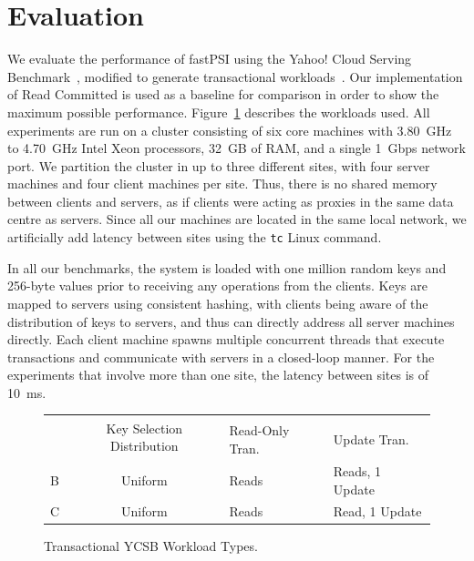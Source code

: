 \section{Evaluation}

We evaluate the performance of fastPSI using the Yahoo! Cloud Serving Benchmark~\citep{ycsb}, modified to generate transactional workloads~\citep{ardekani_nmsi, ardekani_gdur}. Our implementation of Read Committed is used as a baseline for comparison in order to show the maximum possible performance. Figure~\ref{fig:workload-types} describes the workloads used. All experiments are run on a cluster consisting of six core machines with 3.80~GHz to 4.70~GHz Intel Xeon processors, 32~GB of RAM, and a single 1~Gbps network port. We partition the cluster in up to three different sites, with four server machines and four client machines per site. Thus, there is no shared memory between clients and servers, as if clients were acting as proxies in the same data centre as servers. Since all our machines are located in the same local network, we artificially add latency between sites using the \texttt{tc} Linux command.

In all our benchmarks, the system is loaded with one million random keys and 256-byte values prior to receiving any operations from the clients. Keys are mapped to servers using consistent hashing, with clients being aware of the distribution of keys to servers, and thus can directly address all server machines directly. Each client machine spawns multiple concurrent threads that execute transactions and communicate with servers in a closed-loop manner. For the experiments that involve more than one site, the latency between sites is of 10~ms.

\begin{figure}[h]
\begin{center}
\begin{tabularx}{0.85\linewidth}{ c | c | >{\centering}X | >{\centering}X }
    & \multirow{2}{*}{Key Selection Distribution}
    & \multicolumn{2}{c}{Operations}
\tabularnewline
    & & Read-Only Tran.
    & Update Tran.
\tabularnewline
    \hline
    B & Uniform & 4 Reads & 3 Reads, 1 Update \tabularnewline
    C & Uniform & 2 Reads & 1 Read, 1 Update \tabularnewline
\end{tabularx}
\end{center}
\caption{Transactional YCSB Workload Types.}
\label{fig:workload-types}
\end{figure}

